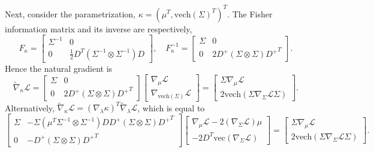 \documentclass{statsoc}
\newcommand\mL{{\mathcal{L}}}
\newcommand{\vc}{\text{vec}}
\newcommand{\vech}{\text{vech}}
\begin{document}
Next, consider the parametrization, $\kappa = (\mu^T, \vech(\Sigma)^T)^T$. The Fisher information matrix and its inverse are respectively, 
\begin{equation*}
F_\kappa = \begin{bmatrix}
\Sigma^{-1} & 0 \\
0 & \frac{1}{2}D^T (\Sigma^{-1} \otimes \Sigma^{-1}) D
\end{bmatrix}, 
\quad
F_\kappa^{-1} = \begin{bmatrix}
\Sigma & 0 \\
0 & 2D^+ (\Sigma \otimes \Sigma) {D^+}^T
\end{bmatrix}.
\end{equation*}
Hence the natural gradient is 
\[
\widetilde{\nabla}_\kappa \mL = \begin{bmatrix}
\Sigma & 0 \\
0 & 2D^+ (\Sigma \otimes \Sigma) {D^+}^T
\end{bmatrix}
\begin{bmatrix}
\nabla_\mu \mL \\ \nabla_{\vech(\Sigma)} \mL
\end{bmatrix} 
= \begin{bmatrix}
\Sigma \nabla_\mu \mL \\ 2 \vech(\Sigma \nabla_\Sigma \mL \Sigma)
\end{bmatrix}.
\]
Alternatively, $\widetilde{\nabla}_\kappa \mL =  (\nabla_\lambda \kappa)^T \widetilde{\nabla}_\lambda \mL$, which is equal to
\[
\begin{bmatrix}
\Sigma & - \Sigma (\mu^T \Sigma^{-1} \otimes \Sigma^{-1}) D D^+ (\Sigma \otimes \Sigma) {D^+}^T \\
0 & - D^+(\Sigma \otimes \Sigma) {D^+}^T \end{bmatrix}
\begin{bmatrix} \nabla_\mu \mL - 2(\nabla_{\Sigma}\mL) \mu \\ -2 D^T \vc(\nabla_{\Sigma} \mL) \end{bmatrix}  
= \begin{bmatrix} \Sigma \nabla_\mu \mL \\ 2 \vech (\Sigma \nabla_{\Sigma} \mL \Sigma ) \end{bmatrix}.
\]
\end{document}
